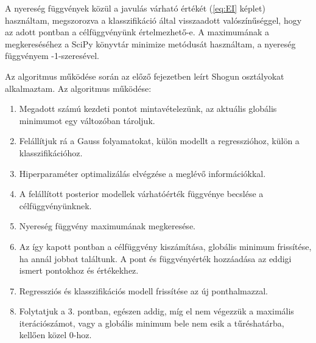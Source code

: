 A nyereség függvények közül a javulás várható értékét (\ref{eq:EI} képlet) használtam, megszorozva a klasszifikáció által visszaadott valószínűséggel, hogy az adott pontban a célfüggvényünk értelmezhető-e. A maximumának a megkereséséhez a SciPy könyvtár minimize metódusát használtam, a nyereség függvényem -1-szeresével.

Az algoritmus működése során az előző fejezetben leírt Shogun osztályokat alkalmaztam. Az algoritmus működése:

\begin{enumerate}
	\item Megadott számú kezdeti pontot mintavételezünk, az aktuális globális minimumot egy változóban tároljuk.
	\item Felállítjuk rá a Gauss folyamatokat, külön modellt a regresszióhoz, külön a klasszifikációhoz.
	\item Hiperparaméter optimalizálás elvégzése a meglévő információkkal.
	\item A felállított posterior modellek várhatóérték függvénye becslése a célfüggvényünknek.
	\item Nyereség függvény maximumának megkeresése.
	\item Az így kapott pontban a célfüggvény kiszámítása, globális minimum frissítése, ha annál jobbat találtunk. A pont és függvényérték hozzáadása az eddigi ismert pontokhoz és értékekhez. 
	\item Regressziós és klasszifikációs modell frissítése az új ponthalmazzal.
	\item Folytatjuk a 3. pontban, egészen addig, míg el nem végezzük a maximális iterációszámot, vagy a globális minimum bele nem esik a tűréshatárba, kellően közel 0-hoz.
\end{enumerate}











